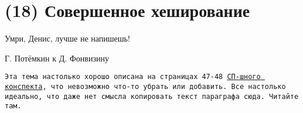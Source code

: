 \section{(18) Совершенное хеширование}

\epigraph{Умри, Денис, лучше не напишешь!}{Г. Потёмкин к Д. Фонвизину}

\texttt{Эта тема настолько хорошо описана на страницах 47-48 \href{https://bsse.compscicenter.ru/wiki/images/b/b6/Algorithms_I.pdf}{СП-шного конспекта}, что невозможно что-то убрать или добавить. Все настолько идеально, что даже нет смысла копировать текст параграфа сюда. Читайте там.}